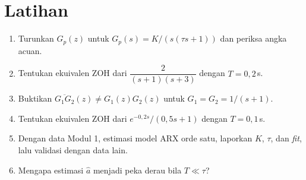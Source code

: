 \section*{Latihan}
\begin{enumerate}
	\item Turunkan $G_p(z)$ untuk $G_p(s) = K/(s(\tau s+1))$ dan periksa angka acuan.
	\item Tentukan ekuivalen ZOH dari $\dfrac{2}{(s+1)(s+3)}$ dengan $T = 0{,}2$\,s.
	\item Buktikan $\overline{G_1G_2}(z) \neq G_1(z)G_2(z)$ untuk $G_1 = G_2 = 1/(s+1)$.
	\item Tentukan ekuivalen ZOH dari $e^{-0{,}2s}/(0{,}5s+1)$ dengan $T = 0{,}1$\,s.
	\item Dengan data Modul 1, estimasi model ARX orde satu, laporkan $K$, $\tau$, dan \textit{fit}, lalu validasi dengan data lain.
	\item Mengapa estimasi $\hat a$ menjadi peka derau bila $T \ll \tau$?
\end{enumerate}
